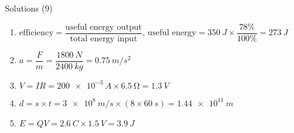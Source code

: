 \documentclass[14pt]{beamer}
\begin{document}
\begin{frame}{Solutions (9)}
\vspace*{-0.8em}\begin{enumerate}
\item\label{17.2} $\text{efficiency} = \dfrac{\text{useful energy output}}{\text{total energy input}}$, $\text{useful energy}=\SI{350}{J}\times\dfrac{78\%}{100\%}=\SI{273}{J}$
\item\label{2.3} $a=\dfrac{F}{m}=\dfrac{\SI{1800}{N}}{\SI{2400}{kg}}=\SI{0.75}{m/s^2}$
\item\label{11.1} $V=IR=\SI{200e-3}{A}\times\SI{6.5}{\ohm}=\SI{1.3}{V}$
\item\label{1.2} $d=s\times t=\SI{3e8}{m/s}\times(8\times\SI{60}{s})=\SI{1.44e11}{m}$
\item\label{13.1} $E=QV=\SI{2.6}{C}\times\SI{1.5}{V}=\SI{3.9}{J}$
\end{enumerate}
\end{frame}
\end{document}
